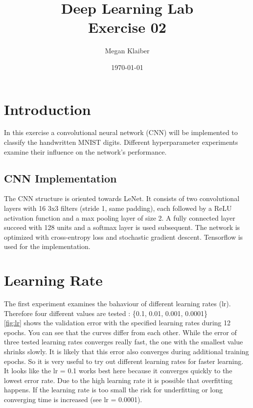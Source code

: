 \documentclass[a4paper,12pt]{article}
\begin{document}
\title{Deep Learning Lab \\ Exercise 02 }
\author{Megan Klaiber}
\date{\today}
\maketitle

\section{Introduction}

In this exercise a convolutional neural network (CNN) will be implemented to classify the handwritten MNIST digits. Different hyperparameter experiments examine their influence on the network's performance.

\subsection{CNN Implementation}
The CNN structure is oriented towards LeNet. It consists of two convolutional layers with 16 3x3 filters (stride 1, same padding), each followed by a ReLU activation function and a max pooling layer of size 2. A fully connected layer succeed with 128 units and a softmax layer is used subsequent. The network is optimized with cross-entropy loss and stochastic gradient descent. Tensorflow is used for the implementation.

\section{Learning Rate}\label{lr}

The first experiment examines the bahaviour of different learning rates (lr). Therefore four different values are tested : \{0.1, 0.01, 0.001, 0.0001\} \\
\autoref{fig:lr} shows the validation error with the specified learning rates during 12 epochs. You can see that the curves differ from each other. While the error of three tested learning rates converges really fast, the one with the smallest value shrinks slowly. It is likely that this error also converges during additional training epochs. So it is very useful to try out different learning rates for faster learning.\\
It looks like the lr = 0.1 works best here because it converges quickly to the lowest error rate. Due to the high learning rate it is possible that overfitting happens. If the learning rate is too small the risk for underfitting or long converging time is increased (see lr = 0.0001).
\end{document}
